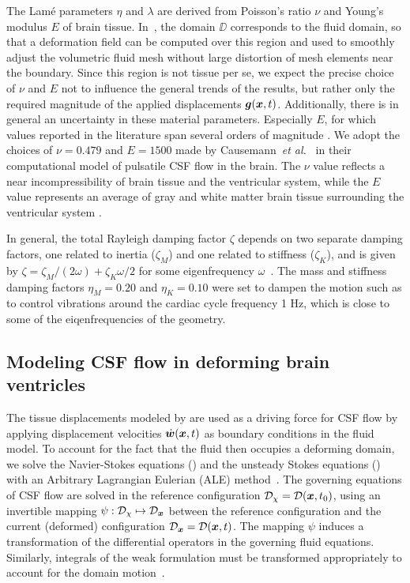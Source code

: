 \documentclass{template}
\begin{document}
The Lamé parameters $\eta$ and $\lambda$ are derived from
Poisson's ratio $\nu$ and Young's modulus $E$ of brain tissue.
In~, the domain $\DD$
corresponds to the fluid domain, so that a deformation field
can be computed over this region and used to smoothly
adjust the volumetric fluid mesh without large distortion
of mesh elements near the boundary. 
Since this region is not tissue per se,
we expect the precise choice of $\nu$ and $E$ not to
influence the general trends of the results, but rather
only the required magnitude of the applied displacements $\bm{g}(\bm{x}, t)$.
Additionally, there is in general an uncertainty
in these material parameters. Especially $E$, 
for which values reported in the literature span several orders of magnitude
\cite{Budday2015Mechanical, Cheng2010ComputationalModel,
Cheng2007UnconfinedCompression, Sweetman2011ThreeDimensional}.
We adopt the choices of $\nu=0.479$ and $E=1500$
made by Causemann~\emph{et al.}~\cite{Causemann2022HumanFramework}
in their computational model of pulsatile CSF flow in the brain. The $\nu$ value 
reflects a near incompressibility of brain tissue and the ventricular system,
while the $E$ value represents an average of
gray and white matter brain tissue surrounding the ventricular system
\cite{Budday2015Mechanical}. 

In general, the total Rayleigh damping factor $\zeta$ depends on
two separate damping factors, one related to inertia ($\zeta_M$)
and one related to stiffness ($\zeta_K$), and is given by
$\zeta = \zeta_M / (2\omega) + \zeta_K\omega / 2$
for some eigenfrequency $\omega$~\cite{ChopraAnilK2007Dynamics}.
The mass and stiffness damping factors
$\eta_M = 0.20$ and $\eta_K = 0.10$ were set to dampen the motion
such as to control vibrations around the cardiac cycle frequency 1 Hz,
which is close to some of the eiqenfrequencies of the geometry.

\subsection{Modeling CSF flow in deforming brain ventricles}
The tissue displacements modeled by 
are used as a driving force for CSF flow by applying displacement velocities
$\dot{\bm{w}}(\bm{x}, t)$ as boundary conditions in the fluid model.
To account for the fact that the fluid then occupies a deforming domain,
we solve the Navier-Stokes equations ()
and the unsteady Stokes equations ()
with an Arbitrary Lagrangian Eulerian (ALE)
method~\cite{Duarte2004ALE,Scovazzi2007LectureNotes}.
The governing equations of CSF flow are solved in the reference configuration
$\mathcal{D}_{\chi} = \mathcal{D}(\bm{x}, t_0)$, using an invertible mapping
$\psi : \mathcal{D}_{\chi}\mapsto\mathcal{D}_{\bm{x}}$ between the reference configuration
and the current (deformed) configuration $\mathcal{D}_{\bm{x}} = \mathcal{D}(\bm{x}, t)$. 
The mapping $\psi$ induces a transformation of the differential operators
in the governing fluid equations. Similarly, integrals of the weak formulation
must be transformed appropriately to account for the
domain motion~\cite{Scovazzi2007LectureNotes}.
\end{document}
